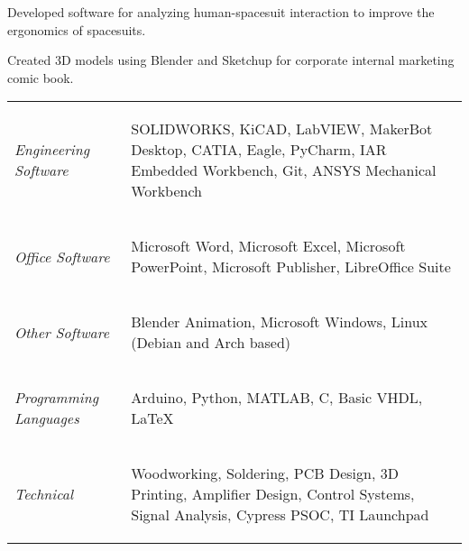 \documentclass[letterpaper,ddMMMyyyy,nonstopmode]{simpleresumecv}
\newcommand{\tableWidth}{23.5em}
\begin{document}
\begin{Body}

            \begin{Description}
                Developed software for analyzing human-spacesuit interaction to improve the ergonomics of spacesuits.
            \end{Description}
            \Gap


            \begin{Description}
                    Created 3D models using Blender and Sketchup for corporate internal marketing comic book.

            \end{Description}



		\Gap
            \def\arraystretch{0}%
            \hspace*{-0.8em}
            \begin{tabular}[t]{p{11em} p{\tableWidth}}
                \textit{Engineering Software} &
                \begin{Detail}
                    SOLIDWORKS, KiCAD, LabVIEW, MakerBot Desktop, CATIA, Eagle, PyCharm, IAR Embedded Workbench, Git, ANSYS Mechanical Workbench
                \end{Detail}\\
                \textit{Office Software} &
                \begin{Detail}
                    Microsoft Word, Microsoft Excel, Microsoft PowerPoint, Microsoft Publisher, LibreOffice Suite
                \end{Detail}\\
                \textit{Other Software}&
                \begin{Detail}
                    Blender Animation, Microsoft Windows, Linux (Debian and Arch based)
                \end{Detail}\\
                \textit{Programming Languages} &
                \begin{Detail}
                    Arduino, Python, MATLAB, C, Basic VHDL, LaTeX
                \end{Detail}\\
                \textit{Technical}&
                \begin{Detail}
                    Woodworking, Soldering, PCB Design, 3D Printing, Amplifier Design, Control Systems, Signal Analysis, Cypress PSOC, TI Launchpad
                \end{Detail}
                \vspace{-1em}


\end{tabular}
\end{Body}
\end{document}
